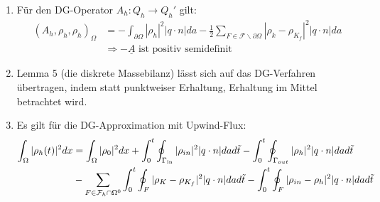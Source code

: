 \begin{remark}
	\begin{enumerate} 
		\item Für den DG-Operator $A_h: Q_h \rightarrow Q_h'$ gilt: 	\newline
		\begin{align*}
			(A_h,\rho_h,\rho_h)_{\Omega} &= - \int_{\partial 	\Omega} | \rho_h | ^2 | q \cdot n | da - \frac{1}{2} \sum_{F 	\in \mathcal{F} \backslash \partial \Omega} | \rho_k - 	\rho_{K_f} |^2 |q \cdot n| da \\
			&\Rightarrow - \underline{A} \text{ ist positiv 	semidefinit}
		\end{align*}
		\item Lemma 5 (die diskrete Massebilanz) lässt sich auf das DG-Verfahren übertragen, indem statt punktweiser Erhaltung, Erhaltung im Mittel betrachtet wird.
		\item Es gilt für die DG-Approximation mit Upwind-Flux: \newline
		\begin{align*}
			\int_{\Omega} | \rho_h (t) | ^2 dx &= \int_{\Omega} |\rho_0 |^2 dx 
			+ \int_0^t \oint_{\Gamma_{{\text{in}}}} | \rho_{in} |^2 |q \cdot n | da d \tilde{t}
			- \int_0^t \oint_{\Gamma_{out}} |\rho_h |^2 |q \cdot n | da d \tilde{t} \\
			&- \sum_{F \in \mathcal{F}_h \cap \Omega^0} \int_0^t \oint_F | \rho_K - \rho_{K_f} |^2 |q \cdot n| da d \tilde{t}
			- \int_0^t \oint_F |\rho_{in} - \rho_h |^2 |q \cdot n| da d \tilde{t}
		\end{align*}
	\end{enumerate}
\end{remark}




